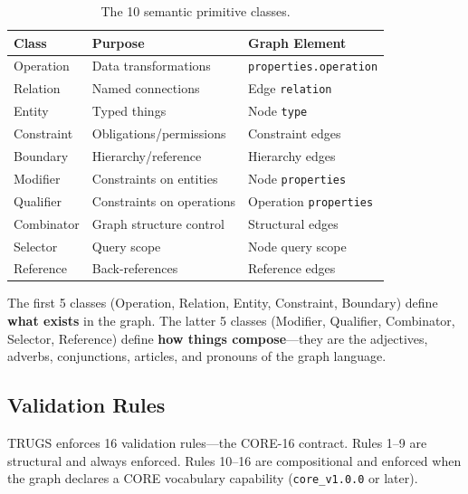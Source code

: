 \documentclass{article}
\begin{document}
\begin{table}[h]
\centering
\caption{The 10 semantic primitive classes.}
\label{tab:primitives}
\begin{tabular}{lll}
\toprule
\textbf{Class} & \textbf{Purpose} & \textbf{Graph Element} \\
\midrule
Operation & Data transformations & \texttt{properties.operation} \\
Relation & Named connections & Edge \texttt{relation} \\
Entity & Typed things & Node \texttt{type} \\
Constraint & Obligations/permissions & Constraint edges \\
Boundary & Hierarchy/reference & Hierarchy edges \\
Modifier & Constraints on entities & Node \texttt{properties} \\
Qualifier & Constraints on operations & Operation \texttt{properties} \\
Combinator & Graph structure control & Structural edges \\
Selector & Query scope & Node query scope \\
Reference & Back-references & Reference edges \\
\bottomrule
\end{tabular}
\end{table}

The first 5 classes (Operation, Relation, Entity, Constraint, Boundary) define \textbf{what exists} in the graph. The latter 5 classes (Modifier, Qualifier, Combinator, Selector, Reference) define \textbf{how things compose}---they are the adjectives, adverbs, conjunctions, articles, and pronouns of the graph language.

\subsection{Validation Rules}

TRUGS enforces 16 validation rules---the CORE-16 contract. Rules 1--9 are structural and always enforced. Rules 10--16 are compositional and enforced when the graph declares a CORE vocabulary capability (\texttt{core\_v1.0.0} or later).
\end{document}
